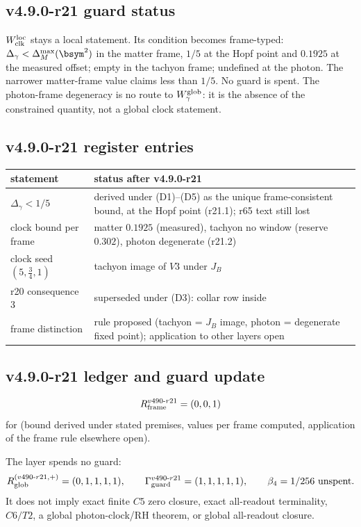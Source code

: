 \subsection*{v4.9.0-r21 guard status}
\label{subsec:v490-r21-guard}

\(W_{\rm clk}^{\rm loc}\) stays a local statement.  Its condition becomes frame-typed: \(\Delta_\gamma<\Delta_M^{\max}(\bsym^2)\) in the
matter frame, \(1/5\) at the Hopf point and \(0.1925\) at the measured offset; empty in the tachyon frame; undefined at the
photon.  The narrower matter-frame value claims less than \(1/5\).  No guard is spent.  The photon-frame degeneracy is no route
to \(W_\gamma^{\rm glob}\): it is the absence of the constrained quantity, not a global clock statement.

\subsection*{v4.9.0-r21 register entries}
\label{subsec:v490-r21-register}

\begin{center}
\small
\begin{tabular}{@{}>{\raggedright\arraybackslash}p{}>{\raggedright\arraybackslash}p{}@{}}
\toprule
statement & status after v4.9.0-r21\\
\midrule
\(\Delta_\gamma<1/5\) & derived under (D1)--(D5) as the unique frame-consistent bound, at the Hopf point (r21.1); r65 text still lost\\
clock bound per frame & matter \(0.1925\) (measured), tachyon no window (reserve \(0.302\)), photon degenerate (r21.2)\\
clock seed \((5,\tfrac34,1)\) & tachyon image of \(V3\) under \(J_B\)\\
r20 consequence 3 & superseded under (D3): collar row inside\\
frame distinction & rule proposed (tachyon = \(J_B\) image, photon = degenerate fixed point); application to other layers open\\
\bottomrule
\end{tabular}
\end{center}

\subsection*{v4.9.0-r21 ledger and guard update}
\label{subsec:v490-r21-ledger-guard}

\[
R_{\rm frame}^{v490\text{-}r21}=(0,0,1)
\]
for (bound derived under stated premises, values per frame computed, application of the frame rule elsewhere open).

The layer spends no guard:
\[
R_{\rm glob}^{(v490\text{-}r21,+)}=(0,1,1,1,1),
\qquad
\Gamma_{\rm guard}^{v490\text{-}r21}=(1,1,1,1,1),
\qquad
\beta_4=1/256\ \text{unspent}.
\]
It does not imply exact finite \(C5\) zero closure, exact all-readout terminality,
\(C6/T2\), a global photon-clock/RH theorem, or global all-readout closure.

